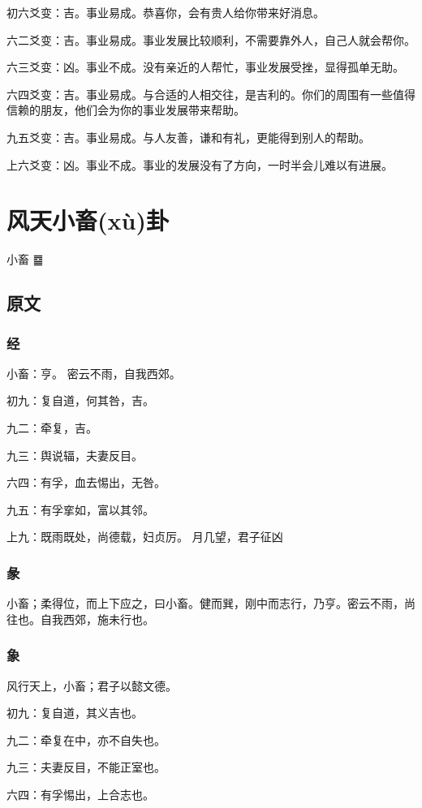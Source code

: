 \documentclass[12pt,oneside]{book}
\begin{document}
初六爻变：吉。事业易成。恭喜你，会有贵人给你带来好消息。

六二爻变：吉。事业易成。事业发展比较顺利，不需要靠外人，自己人就会帮你。

六三爻变：凶。事业不成。没有亲近的人帮忙，事业发展受挫，显得孤单无助。

六四爻变：吉。事业易成。与合适的人相交往，是吉利的。你们的周围有一些值得信赖的朋友，他们会为你的事业发展带来帮助。

九五爻变：吉。事业易成。与人友善，谦和有礼，更能得到别人的帮助。

上六爻变：凶。事业不成。事业的发展没有了方向，一时半会儿难以有进展。

\chapter{风天小畜(xù)卦}
小畜 {\Large ䷈}

\section{原文}

\subsection{经}
小畜：亨。 密云不雨，自我西郊。

初九：复自道，何其咎，吉。

九二：牵复，吉。

九三：舆说辐，夫妻反目。

六四：有孚，血去惕出，无咎。

九五：有孚挛如，富以其邻。

上九：既雨既处，尚德载，妇贞厉。 月几望，君子征凶

\subsection{彖}
小畜；柔得位，而上下应之，曰小畜。健而巽，刚中而志行，乃亨。密云不雨，尚往也。自我西郊，施未行也。

\subsection{象}
风行天上，小畜；君子以懿文德。

初九：复自道，其义吉也。

九二：牵复在中，亦不自失也。

九三：夫妻反目，不能正室也。

六四：有孚惕出，上合志也。
\end{document}
